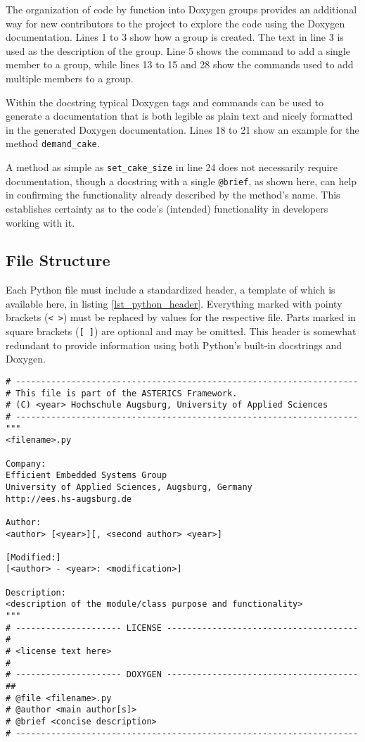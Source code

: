 The organization of code by function into Doxygen groups provides an additional way for new contributors to the project to explore the code using the Doxygen documentation.
Lines 1 to 3 show how a group is created.
The text in line 3 is used as the description of the group.
Line 5 shows the command to add a single member to a group, while lines 13 to 15 and 28 show the commands used to add multiple members to a group.

Within the docstring typical Doxygen tags and commands can be used to generate a documentation that is both legible as plain text and nicely formatted in the generated Doxygen documentation.
Lines 18 to 21 show an example for the method \texttt{demand\_cake}.

A method as simple as \texttt{set\_cake\_size} in line 24 does not necessarily require documentation, though a docstring with a single \texttt{@brief}, as shown here, can help in confirming the functionality already described by the method's name.
This establishes certainty as to the code's (intended) functionality in developers working with it. 

\subsection{File Structure}

Each Python file must include a standardized header, a template of which is available here, in listing \ref{lst_python_header}.
Everything marked with pointy brackets (\texttt{< >}) must be replaced by values for the respective file.
Parts marked in square brackets (\texttt{[ ]}) are optional and may be omitted.
This header is somewhat redundant to provide information using both Python's built-in docstrings and Doxygen.


\begin{lstlisting}[style=AutomaticsPython, caption={Template for the standard header of a python source file.}, label=lst_python_header]
# --------------------------------------------------------------------
# This file is part of the ASTERICS Framework.
# (C) <year> Hochschule Augsburg, University of Applied Sciences
# --------------------------------------------------------------------
"""
<filename>.py

Company:
Efficient Embedded Systems Group
University of Applied Sciences, Augsburg, Germany
http://ees.hs-augsburg.de

Author:
<author> [<year>][, <second author> <year>]

[Modified:]
[<author> - <year>: <modification>]

Description:
<description of the module/class purpose and functionality>
"""
# --------------------- LICENSE --------------------------------------
#
# <license text here>
#
# --------------------- DOXYGEN --------------------------------------
##
# @file <filename>.py
# @author <main author[s]>
# @brief <concise description>
# --------------------------------------------------------------------
\end{lstlisting}

